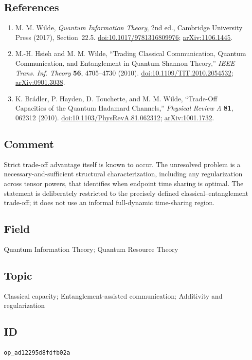 \subsection*{References}

\begin{enumerate}[label={},leftmargin=4.8em,labelsep=0.5em]
  \footnotesize
  \item[\textup{[Wil17]}]\label{ref:p79-wilde}
  M. M. Wilde, \emph{Quantum Information Theory}, 2nd ed., Cambridge
  University Press (2017), Section~22.5.
  \href{https://doi.org/10.1017/9781316809976}{doi:10.1017/9781316809976};
  \href{https://arxiv.org/abs/1106.1445}{arXiv:1106.1445}.

  \item[\textup{[HW10]}]\label{ref:p79-hsieh-wilde}
  M.-H. Hsieh and M. M. Wilde,
  ``Trading Classical Communication, Quantum Communication, and Entanglement
  in Quantum Shannon Theory,''
  \emph{IEEE Trans. Inf. Theory} \textbf{56}, 4705--4730 (2010).
  \href{https://doi.org/10.1109/TIT.2010.2054532}{doi:10.1109/TIT.2010.2054532};
  \href{https://arxiv.org/abs/0901.3038}{arXiv:0901.3038}.

  \item[\textup{[BHTW10]}]\label{ref:p79-bradler-et-al}
  K. Br\'adler, P. Hayden, D. Touchette, and M. M. Wilde,
  ``Trade-Off Capacities of the Quantum Hadamard Channels,''
  \emph{Physical Review A} \textbf{81},
  062312 (2010).
  \href{https://doi.org/10.1103/PhysRevA.81.062312}{doi:10.1103/PhysRevA.81.062312};
  \href{https://arxiv.org/abs/1001.1732}{arXiv:1001.1732}.
\end{enumerate}

\subsection*{Comment}

Strict trade-off advantage itself is known to occur.  The unresolved problem
is a necessary-and-sufficient structural characterization, including any
regularization across tensor powers, that identifies when endpoint time
sharing is optimal.  The statement is deliberately
restricted to the precisely defined classical--entanglement trade-off; it
does not use an informal full-dynamic time-sharing region.

\subsection*{Field}

Quantum Information Theory; Quantum Resource Theory

\subsection*{Topic}

Classical capacity; Entanglement-assisted communication; Additivity and regularization

\subsection*{ID}

\texttt{op\_ad12295d8fdfb02a}
